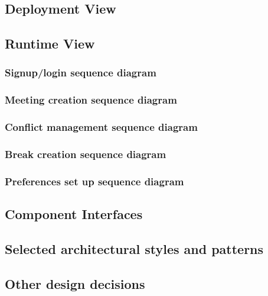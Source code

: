 \documentclass{article}
\begin{document}
\subsection{Deployment View}\label{deploymentview}

\clearpage

\subsection{Runtime View}\label{runtimeview}
\subsubsection{Signup/login sequence diagram}


\clearpage
\subsubsection{Meeting creation sequence diagram}


\clearpage
\subsubsection{Conflict management sequence diagram}


\clearpage
\subsubsection{Break creation sequence diagram}


\clearpage
\subsubsection{Preferences set up sequence diagram}


\clearpage

\subsection{Component Interfaces}\label{componentinterfaces}


\subsection{Selected architectural styles and patterns}\label{archstyles}


\subsection{Other design decisions}\label{otherdecisions}
\end{document}
